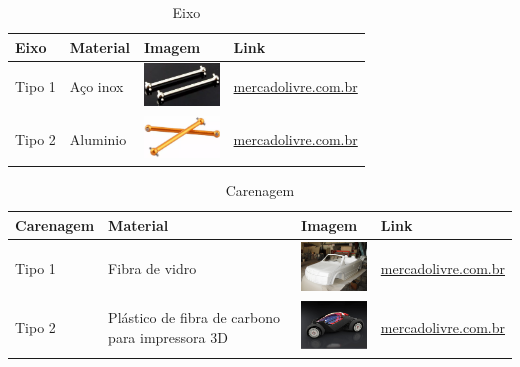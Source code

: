   \begin{table}[!htbp]
  \begin{center}
  \caption{Eixo}
  \begin{tabular}{|p{2cm}|p{3cm}|p{2cm}|p{4cm}|}
  \hline
  \textbf{Eixo} & \textbf{Material} & \textbf{Imagem} & \textbf{Link}\\\hline\hline
  Tipo 1 & Aço inox & \includegraphics[width=2cm]{figuras/eixo_inox.eps} & \href{http://produto.mercadolivre.com.br/MLB-681527051-par-de-eixo-dogbone-84-mm-06061-redcat-himoto-exceed-hsp-_JM}{mercadolivre.com.br}\\\hline
  Tipo 2 & Aluminio  & \includegraphics[width=2cm]{figuras/eixo_aluminio.eps} & \href{http://produto.mercadolivre.com.br/MLB-700430643-eixos-dogbones-em-aluminio-mastadon-spino-himoto-23608-par-_JM}{mercadolivre.com.br}\\\hline
  \end{tabular}
  \end{center}
  \end{table}

    \begin{table}[!htbp]
    	\begin{center}
    		\caption{Carenagem}
    		\begin{tabular}{|p{3cm}|p{3cm}|p{2cm}|p{4cm}|}
    			\hline
    			\textbf{Carenagem} & \textbf{Material} & \textbf{Imagem} & \textbf{Link}\\\hline\hline
    			Tipo 1 & Fibra de vidro & \includegraphics[width=2cm]{figuras/carenagem_fibra.eps} & \href{http://produto.mercadolivre.com.br/MLB-712761072-kit-resina-500g-manta-fibra-de-vidro-300g-10g-catalizador-_JM}{mercadolivre.com.br}\\\hline
    			Tipo 2 & Plástico de fibra de carbono para impressora 3D & \includegraphics[width=2cm]{figuras/carenagem_plastico.eps} & \href{http://produto.mercadolivre.com.br/MLB-704169297-envelopamento-fibra-carbono-teto-ou-capo-1x122-_JM}{mercadolivre.com.br}\\\hline
    		\end{tabular}
    	\end{center}
    \end{table}


